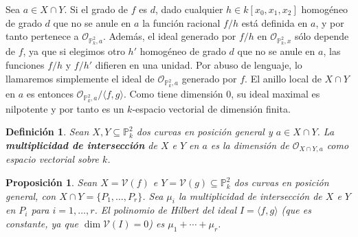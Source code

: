 \documentclass[a4paper,10pt]{book}
\newtheorem{prop}[thm]{Proposición}
\newtheorem{defn}[thm]{Definición}
\newcommand{\PP}{\mathbb P}
\newcommand{\VV}{{\mathcal V}}
\begin{document}
Sea $a\in X\cap Y$. Si el grado de $f$ es $d$, dado cualquier $h\in k[x_0,x_1,x_2]$ homogéneo de grado $d$ que no se anule en $a$ la función racional $f/h$ está definida en $a$, y por tanto pertenece a ${\mathcal O}_{\PP^2_k,a}$. Además, el ideal generado por $f/h$ en ${\mathcal O}_{\PP^2_k,x}$ sólo depende de $f$, ya que si elegimos otro $h'$ homogéneo de grado $d$ que no se anule en $a$, las funciones ${f}/{h}$ y ${f}/{h'}$ difieren en una unidad. Por abuso de lenguaje, lo llamaremos simplemente el ideal de ${\mathcal O}_{\PP^2_k,a}$ generado por $f$. El anillo local de $X\cap Y$ en $a$ es entonces ${\mathcal O}_{\PP^2_k,a}/\langle f,g\rangle$. Como tiene dimensión $0$, su ideal maximal es nilpotente \cite[Proposición 8.6]{am} y por tanto es un $k$-espacio vectorial de dimensión finita. 

\begin{defn}
 Sean $X,Y\subseteq\PP^2_k$ dos curvas en posición general y $a\in X\cap Y$. La {\bf multiplicidad de intersección} de $X$ e $Y$ en $a$ es la dimensión de ${\mathcal O}_{X\cap Y,a}$ como espacio vectorial sobre $k$.
\end{defn}
 
\begin{prop}
 Sean $X=\VV(f)$ e $Y=\VV(g)\subseteq\PP^2_k$ dos curvas en posición general, con $X\cap Y=\{P_1,\ldots,P_r\}$. Sea $\mu_i$ la multiplicidad de intersección de $X$ e $Y$ en $P_i$ para $i=1,\ldots,r$. El polinomio de Hilbert del ideal $I=\langle f,g\rangle$ (que es constante, ya que $\dim\VV(I)=0$) es $\mu_1+\cdots+\mu_r$. 
\end{prop}
\end{document}
